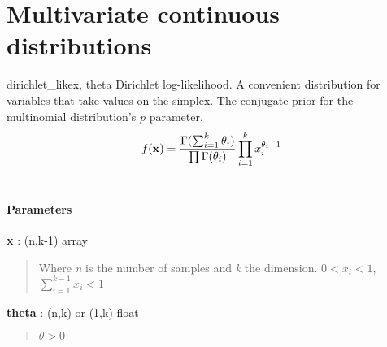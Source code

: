 \section{Multivariate continuous distributions}

\hypertarget{pymc.distributions.dirichlet_like}{}
\begin{funcdesc}{dirichlet\_like}{x, theta}
Dirichlet log-likelihood. A convenient distribution for variables that take values on the simplex. The conjugate prior for the multinomial distribution's $p$ parameter.
\begin{gather}
\begin{split}f(\mathbf{x}) = \frac{\Gamma(\sum_{i=1}^k \theta_i)}{\prod \Gamma(\theta_i)} \prod_{i=1}^k x_i^{\theta_i - 1}\end{split}\notag\\\begin{split}\end{split}\notag
\end{gather}\paragraph{Parameters}\begin{paramlist}

\item[] \textbf{x} : (n,k-1) array
\begin{quote}

Where \emph{n} is the number of samples and \emph{k} the dimension.
$0 < x_i < 1$,  $\sum_{i=1}^{k-1} x_i < 1$
\end{quote}

\item[] \textbf{theta} : (n,k) or (1,k) float
\begin{quote}

$\theta > 0$
\end{quote}
\end{paramlist}
\end{funcdesc}

